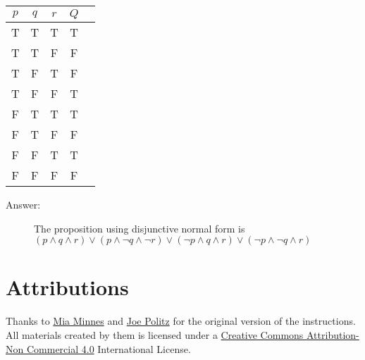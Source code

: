 \documentclass[12pt, oneside]{article}
\begin{document}
\begin{enumerate}
\begin{center}
\begin{tabular}{|c|c|c|c|c|}
\hline
$p$ & $q$ & $r$ & $Q$ \\ \hline \hline
T&T&T& T \\ \hline
T&T&F& F \\ \hline
T&F&T& F \\ \hline
T&F&F& T \\ \hline
F&T&T& T \\ \hline
F&T&F& F \\ \hline
F&F&T& T \\ \hline
F&F&F& F \\ \hline
\end{tabular}
\end{center}

\begin{description}
    \item[Answer:] The proposition using disjunctive normal form is $(p \wedge q \wedge r) \vee (p \wedge \lnot q \wedge \lnot r) \lor (\lnot p \land q \land r) \lor (\lnot p \land \lnot q \land r)$
\end{description}

\end{enumerate}

\section*{Attributions}

Thanks to \href{http://cseweb.ucsd.edu/~minnes/}{Mia Minnes} and \href{https://jpolitz.github.io/}{Joe Politz} for the original version of the instructions. All materials created by them is licensed under a \href{http://creativecommons.org/licenses/by-nc/4.0/}{Creative Commons Attribution-Non Commercial 4.0} International License.
\end{document}
